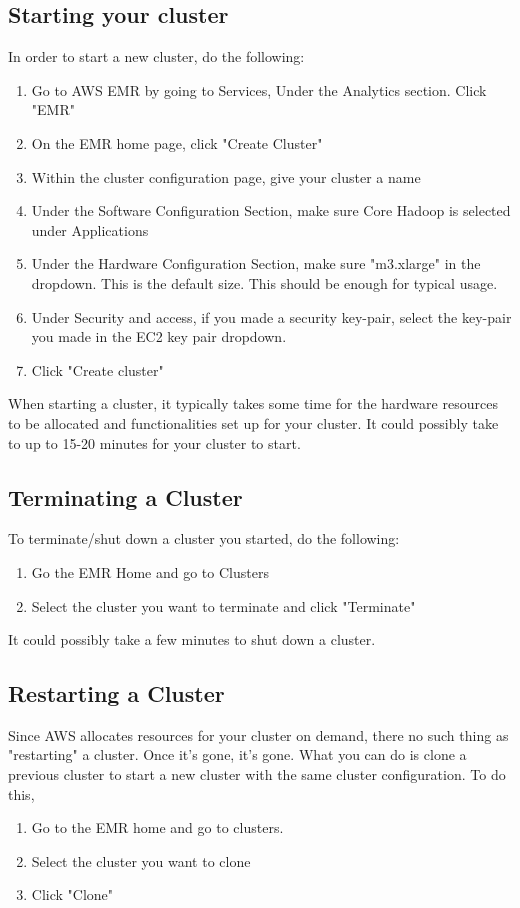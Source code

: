 \documentclass{article}
\begin{document}
\subsection{Starting your cluster}
In order to start a new cluster, do the following:
\begin{enumerate}
    \item Go to AWS EMR by going to Services,  Under the Analytics section. Click "EMR"
    \item On the EMR home page, click "Create Cluster"
    \item Within the cluster configuration page, give your cluster a name
    \item Under the Software Configuration Section, make sure Core Hadoop is selected under Applications
    \item Under the Hardware Configuration Section, make sure "m3.xlarge" in the dropdown. This is the default size. This should be enough for typical usage.
    \item Under Security and access, if you made a security key-pair, select the key-pair you made in the EC2 key pair dropdown.
    \item Click "Create cluster"
\end{enumerate}
\begin{info}
When starting a cluster, it typically takes some time for the hardware resources to be allocated and functionalities set up for your cluster. It could possibly take to up to 15-20 minutes for your cluster to start.
\end{info}
\subsection{Terminating a Cluster}
To terminate/shut down a cluster you started, do the following:
\begin{enumerate}
    \item Go the EMR Home and go to Clusters
    \item Select the cluster you want to terminate and click "Terminate"
\end{enumerate}
\begin{info}
It could possibly take a few minutes to shut down a cluster.
\end{info}
\subsection{Restarting a Cluster}
Since AWS allocates resources for your cluster on demand, there no such thing as "restarting" a cluster. Once it's gone, it's gone. What you can do is clone a previous cluster to start a new cluster with the same cluster configuration. To do this, 
\begin{enumerate}
    \item Go to the EMR home and go to clusters. 
    \item Select the cluster you want to clone
    \item Click "Clone"
\end{enumerate}
\end{document}
